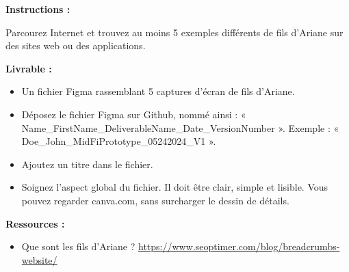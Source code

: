 \makeheaderfiles

\textbf{Instructions :}

Parcourez Internet et trouvez au moins 5 exemples différents de fils d'Ariane sur des sites web ou des applications.

\textbf{Livrable :}

\begin{itemize}
\item Un fichier Figma rassemblant 5 captures d'écran de fils d'Ariane.
\item Déposez le fichier Figma sur Github, nommé ainsi : « Name\_FirstName\_DeliverableName\_Date\_VersionNumber ». Exemple : « Doe\_John\_MidFiPrototype\_05242024\_V1 ».
\item Ajoutez un titre dans le fichier.
\item Soignez l'aspect global du fichier. Il doit être clair, simple et lisible. Vous pouvez regarder canva.com, sans surcharger le dessin de détails.
\end{itemize}

\textbf{Ressources :}

\begin{itemize}
\item Que sont les fils d'Ariane ? \url{https://www.seoptimer.com/blog/breadcrumbs-website/}
\end{itemize}

